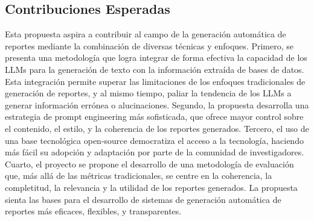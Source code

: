 \subsection{Contribuciones Esperadas}

Esta propuesta aspira a contribuir al campo de la generación automática de reportes mediante la combinación de diversas técnicas y enfoques. Primero, se presenta una metodología que logra integrar de forma efectiva la capacidad de los LLMs para la generación de texto con la información extraída de bases de datos. Esta integración permite superar las limitaciones de los enfoques tradicionales de generación de reportes, y al mismo tiempo, paliar la tendencia de los LLMs a generar información errónea o alucinaciones.
Segundo, la propuesta desarrolla una estrategia de prompt engineering más sofisticada, que ofrece mayor control sobre el contenido, el estilo, y la coherencia de los reportes generados. Tercero, el uso de una base tecnológica open-source democratiza el acceso a la tecnología, haciendo más fácil su adopción y adaptación por parte de la comunidad de investigadores. Cuarto, el proyecto se propone el desarrollo de una metodología de evaluación que, más allá de las métricas tradicionales, se centre en la coherencia, la completitud, la relevancia y la utilidad de los reportes generados. La propuesta sienta las bases para el desarrollo de sistemas de generación automática de reportes más eficaces, flexibles, y transparentes.